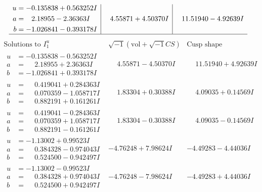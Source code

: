 \documentclass[1p]{elsarticle_modified}
\theoremstyle{definition}
\newcommand{\I}{\sqrt{-1}}
\begin{document}
$$\begin{array}{c|c|c}
\begin{aligned}
u &= -0.135838 + 0.563252 I \\
a &= \phantom{-}2.18955 - 2.36363 I \\
b &= -1.026841 - 0.393178 I\end{aligned}
 & \phantom{-}4.55871 + 4.50370 I & \phantom{-}11.51940 - 4.92639 I\\
 \hline 
 \end{array}$$\newpage$$\begin{array}{c|c|c}  
\text{Solutions to }I^u_{1}& \I (\text{vol} + \sqrt{-1}CS) & \text{Cusp shape}\\
 \hline 
\begin{aligned}
u &= -0.135838 - 0.563252 I \\
a &= \phantom{-}2.18955 + 2.36363 I \\
b &= -1.026841 + 0.393178 I\end{aligned}
 & \phantom{-}4.55871 - 4.50370 I & \phantom{-}11.51940 + 4.92639 I \\ \hline\begin{aligned}
u &= \phantom{-}0.419041 + 0.284363 I \\
a &= \phantom{-}0.070359 - 1.058717 I \\
b &= \phantom{-}0.882191 + 0.161261 I\end{aligned}
 & \phantom{-}1.83304 + 0.30388 I & \phantom{-}4.09035 + 0.14569 I \\ \hline\begin{aligned}
u &= \phantom{-}0.419041 - 0.284363 I \\
a &= \phantom{-}0.070359 + 1.058717 I \\
b &= \phantom{-}0.882191 - 0.161261 I\end{aligned}
 & \phantom{-}1.83304 - 0.30388 I & \phantom{-}4.09035 - 0.14569 I \\ \hline\begin{aligned}
u &= -1.13002 + 0.99523 I \\
a &= \phantom{-}0.384328 - 0.974043 I \\
b &= \phantom{-}0.524500 - 0.942497 I\end{aligned}
 & -4.76248 + 7.98624 I & -4.49283 - 4.44036 I \\ \hline\begin{aligned}
u &= -1.13002 - 0.99523 I \\
a &= \phantom{-}0.384328 + 0.974043 I \\
b &= \phantom{-}0.524500 + 0.942497 I\end{aligned}
 & -4.76248 - 7.98624 I & -4.49283 + 4.44036 I \\ \hline\begin{aligned}

\end{aligned}
\end{array}$$
\end{document}
